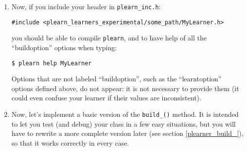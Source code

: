 \documentclass[11pt]{book}
\begin{document}
\begin{enumerate}
\begin{verbatim}
    // First, the public build options
    declareOption(ol, "init_params", &MyLearner::init_params,
                  OptionBase::buildoption,
                  "Initial parameters");

    declareOption(ol, "learning_method", &MyLearner::learning_method,
                  OptionBase::buildoption,
                  "Method to use for performing learning.\n"
                  "One of:\n"
                  "  - "none": use raw data\n"
                  "  - "first": first method\n"
                  "  - "second": second method\n");

    // Then, the learned options
    declareOption(ol, "nparams", &MyLearner::nparams,
                  OptionBase::learntoption,
                  "Number of initial parameters");

    declareOption(ol, "method", &MyLearner::method,
                  OptionBase::learntoption,
                  "'learning_method' as a number:\n"
                  "0 for none, 1 for first, 2 for second.\n");

    declareOption(ol, "learned_params", &MyLearner::learned_params,
                  OptionBase::learntoption,
                  "Learned parameters: a matrix of size (nparams *"
                  " inputsize())");

    // Now call the parent class' declareOptions
    inherited::declareOptions(ol);
}
\end{verbatim}

\item Now, if you include your header in {\tt plearn\_inc.h}:
\begin{verbatim}
#include <plearn_learners_experimental/some_path/MyLearner.h>
\end{verbatim}
you should be able to compile {\tt plearn}, and to have help of all the
``buildoption'' options when typing:
\begin{verbatim}
$ plearn help MyLearner
\end{verbatim}
Options that are not labeled ``buildoption'', such as the
``learntoption'' options defined above, do not appear: it is not
necessary to provide them (it could even confuse your learner if their
values are inconsistent).

\item Now, let's implement a basic version of the {\tt build\_()}
method. It is intended to let you test (and debug) your class in a few
easy situations, but you will have to rewrite a more complete version
later (see section \ref{plearner_build_}), so that it works correctly in
every case.


\end{enumerate}
\end{document}
